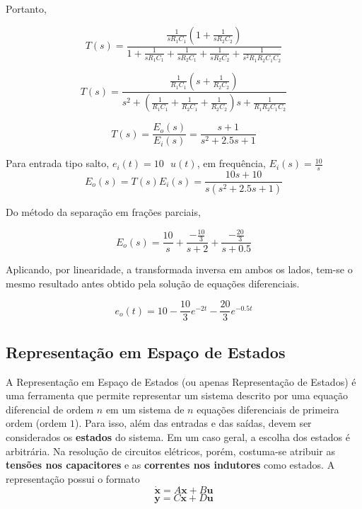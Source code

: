 \documentclass{article}
\numberwithin{equation}{section}
\begin{document}
Portanto,

$$T(s) = \frac{\displaystyle{\frac{1}{sR_{1}C_{1}}} \left(1 +\displaystyle{\frac{1}{sR_{2}C_{2}}}\right)}{1 + \displaystyle{\frac{1}{sR_{1}C_{1}}}+\displaystyle{\frac{1}{sR_{2}C_{1}}}+\displaystyle{\frac{1}{sR_{2}C_{2}}} + \frac{1}{s^2R_{1}R_{2}C_{1}C_{2}}}$$

$$T(s) = \frac{\displaystyle{\frac{1}{R_{1}C_{1}}} \left(s +\displaystyle{\frac{1}{R_{2}C_{2}}}\right)}{s^2 + \left(\displaystyle{\frac{1}{R_{1}C_{1}}}+\displaystyle{\frac{1}{R_{2}C_{1}}}+\displaystyle{\frac{1}{R_{2}C_{2}}}\right)s + \displaystyle{\frac{1}{R_{1}R_{2}C_{1}C_{2}}}}$$

$$T(s) = \frac{E_{o}(s)}{E_{i}(s)} =\displaystyle{\frac{s+1}{s^2+2.5s+1}}$$

Para entrada tipo salto, $e_i(t) = 10 \text{ } u(t)$, em frequência, $E_{i}(s)=\displaystyle{\frac{10}{s}}$
$$E_{o}(s)=T(s)E_{i}(s)=\displaystyle{\frac{10s+10}{s(s^2+2.5s+1)}}$$

Do método da separação em frações parciais,

$$E_{o}(s) = \frac{10}{s} +\frac{-\displaystyle{\frac{10}{3}}}{s+2} +\frac{-\displaystyle{\frac{20}{3}}}{s+0.5}$$

Aplicando, por linearidade, a transformada inversa em ambos os lados, tem-se o mesmo resultado antes obtido pela solução de equações diferenciais.

$$e_{o}(t) = 10 - \frac{10}{3}e^{-2t} - \frac{20}{3}e^{-0.5t}$$

\subsection{Representação em Espaço de Estados}
\label{subsec:estado}
A Representação em Espaço de Estados (ou apenas Representação de Estados) é uma ferramenta que permite representar um sistema descrito por uma equação diferencial de ordem $n$ em um sistema de $n$ equações diferenciais de primeira ordem (ordem $1$). Para isso, além das entradas e das saídas, devem ser considerados os \textbf{estados} do sistema. Em um caso geral, a escolha dos estados é arbitrária. Na resolução de circuitos elétricos, porém, costuma-se atribuir as \textbf{tensões nos capacitores} e as \textbf{correntes nos indutores} como estados. A representação possui o formato
\begin{equation}
    \dot{\textbf{x}}=A\textbf{x}+B\textbf{u}
\end{equation}
\begin{equation}
    \textbf{y}=C\textbf{x}+D\textbf{u}
\end{equation}
\end{document}

